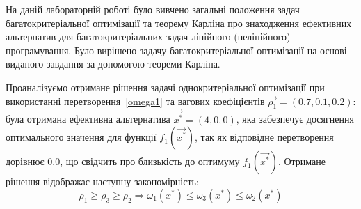 На даній лабораторній роботі було вивчено загальні положення задач багатокритеріальної оптимізації та теорему Карліна про знаходження ефективних альтернатив для багатокритеріальних задач лінійного (нелінійного) програмування. 
Було вирішено задачу багатокритеріальної оптимізації на основі виданого завдання за допомогою  теореми Карліна.

Проаналізуємо отримане рішення задачі однокритеріальної оптимізації при використанні перетворення~\eqref{omega1} та вагових коефіцієнтів $\vec{\rho_1} = (0.7, 0.1, 0.2)$:
була отримана ефективна альтернатива $\vec{x^*} = (4,0,0)$, яка забезпечує досягнення оптимального значення для  функції $f_1(\vec{x^*})$, так як відповідне перетворення дорівнює $0.0$, що свідчить про близькість до оптимуму $f_1(\vec{x^*})$. Отримане рішення відображає наступну закономірність:
\[
\rho_1 \geq \rho_3 \geq \rho_2 \Longrightarrow \omega_1(x^*) \leq \omega_3(x^*) \leq \omega_2(x^*) 
\]



